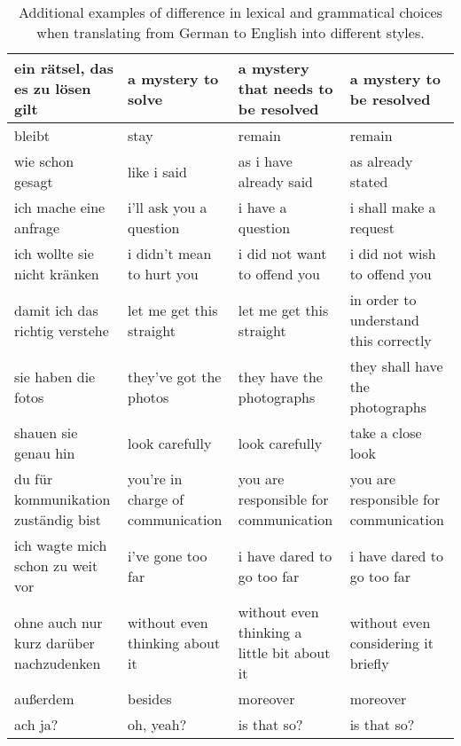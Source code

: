 \documentclass[11pt,a4paper]{article}
\begin{document}
\begin{table*}[]
\begin{tabular}{|p{3.5cm}|p{3.5cm}|p{3.5cm}|p{3.5cm}|}
ein r{\"a}tsel, das es zu l{\"o}sen gilt        & a mystery to solve                & a mystery that needs to be resolved         & a mystery to be resolved              \\ \hline
bleibt                                  & stay                              & remain                                      & remain                                \\ \hline
wie schon gesagt                        & like i said                       & as i have already said                      & as already stated                     \\ \hline
ich mache eine anfrage                  & i'll ask you a question           & i have a question                           & i shall make a request                \\ \hline
ich wollte sie nicht kr{\"a}nken            & i didn't mean to hurt you         & i did not want to offend you                & i did not wish to offend you          \\ \hline
damit ich das richtig verstehe          & let me get this straight          & let me get this straight                    & in order to understand this correctly \\ \hline
sie haben die fotos                     & they've got the photos            & they have the photographs                   & they shall have the photographs       \\ \hline
shauen sie genau hin                    & look carefully                    & look carefully                              & take a close look                     \\ \hline
du f{\"u}r kommunikation zust{\"a}ndig bist     & you're in charge of communication & you are responsible for communication       & you are responsible for communication \\ \hline
ich wagte mich schon zu weit vor        & i've gone too far                 & i have dared to go too far                  & i have dared to go too far            \\ \hline
ohne auch nur kurz dar{\"u}ber nachzudenken & without even thinking about it    & without even thinking a little bit about it & without even considering it briefly   \\ \hline
au{\ss}erdem                                & besides                           & moreover                                    & moreover                              \\ \hline
ach ja?                                 & oh, yeah?                         & is that so?                                 & is that so?                           \\ \hline
\end{tabular}
\caption{\small Additional examples of difference in lexical and grammatical choices when translating from German to English into different styles.
      }
      \label{tab-deen-examples-extended}
\end{table*}
\end{document}
